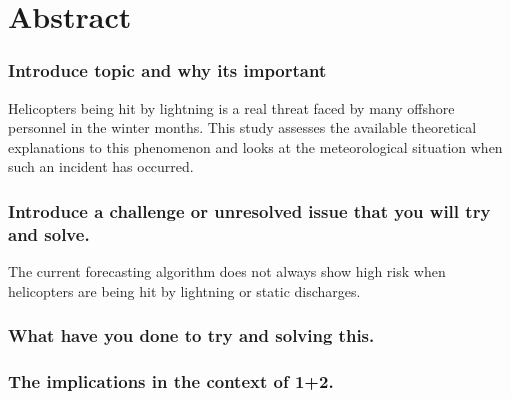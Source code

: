 \chapter*{Abstract}

\subsection*{Introduce topic and why its important}
Helicopters being hit by lightning is a real threat faced by many offshore personnel in the winter months. This study assesses the available theoretical explanations to this phenomenon and looks at the meteorological situation when such an incident has occurred.

\subsection*{Introduce a challenge or unresolved issue that you will try and solve.} 
The current forecasting algorithm does not always show high risk when helicopters are being hit by lightning or static discharges.

\subsection*{What have you done to try and solving this.}



\subsection*{The implications in the context of 1+2.}
